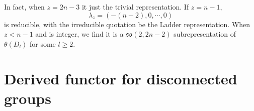 \documentclass[12pt]{article}
\def\aso{\mathfrak{so}}
\begin{document}
In fact, when $z=2n-3$ it just the trivial representation. 
If $z= n-1$, 
\[
\lambda_{z} = (-(n-2), 0, \cdots, 0)
\]
is reducible, with the irreducible quotation be the Ladder representation. 
When $z < n-1$ and is integer,
we find it is a $\aso(2,2n-2)$ subrepresentation of $\theta(D_l)$ for some $l\geq 2$.  

\section{Derived functor for disconnected groups}



{}

\end{document}

